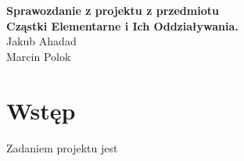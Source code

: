 {
	\centering
	{\large\bfseries Sprawozdanie z projektu z przedmiotu \\
	Cząstki Elementarne i Ich Oddziaływania.\\}
	\vspace{1em}
	{
	Jakub Ahadad\\

	Marcin Polok\\
	}
	\vspace{3em}
}

\section{Wstęp}
Zadaniem projektu jest 
